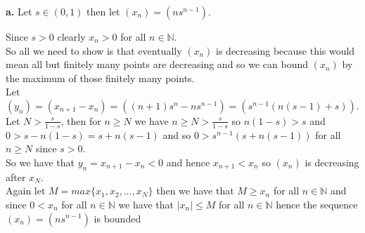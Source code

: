 \documentclass{article}
\begin{document}
{\Large\textbf{a.}} Let $s\in (0, 1)$ then let $(x_n) = (ns^{n-1})$.
\begin{center}
    \doublespacing
    Since $s > 0$ clearly $x_n > 0$ for all $n\in\mathbb{N}$.
    \\So all we need to show is that eventually $(x_n)$ is decreasing because this would mean all but finitely many points are decreasing and so we can bound $(x_n)$ by the maximum of those finitely many points.
    \\Let $(y_n) = (x_{n+1} - x_n) = ((n+1)s^n - ns^{n-1}) = (s^{n-1} (n(s - 1) + s))$.
    \\Let $N >\frac{s}{1-s}$, then for $n\geq N$ we have $n\geq N >\frac{s}{1-s}$ so $n(1-s) > s$ and $0 > s - n(1-s) = s + n(s-1)$ and so $0 > s^{n-1}(s + n(s-1))$ for all $n\geq N$ since $s > 0$.
    \\So we have that $y_n = x_{n+1} - x_n < 0$ and hence $x_{n+1} < x_n$ so $(x_n)$ is decreasing after $x_N$.
    \\Again let $M = max\{x_1, x_2, ..., x_N\}$ then we have that $M\geq x_n$ for all $n\in\mathbb{N}$ and since $0 < x_n$ for all $n\in\mathbb{N}$ we have that $|x_n|\leq M$ for all $n\in\mathbb{N}$ hence the sequence $(x_n) = (ns^{n-1})$ is bounded \qedsymbol
\end{center}
\end{document}
